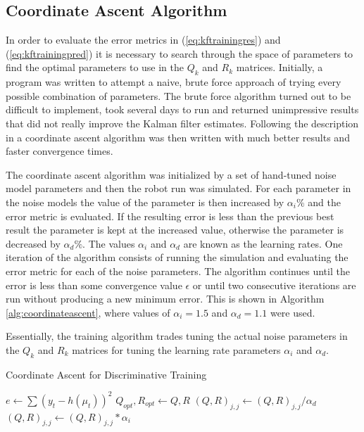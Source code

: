\subsection{Coordinate Ascent Algorithm}
\label{sec:coordinateAscent}
In order to evaluate the error metrics in (\ref{eq:kftrainingres}) and (\ref{eq:kftrainingpred}) it is necessary to search through the space of parameters to find the optimal parameters to use in the $Q_k$ and $R_k$ matrices. Initially, a program was written to attempt a naive, brute force approach of trying every possible combination of parameters. The brute force algorithm turned out to be difficult to implement, took several days to run and returned unimpressive results that did not really improve the Kalman filter estimates. Following the description in \cite{Abbeel-RSS-05} a coordinate ascent algorithm was then written with much better results and faster convergence times.

The coordinate ascent algorithm was initialized by a set of hand-tuned noise model parameters and then the robot run was simulated. For each parameter in the noise models the value of the parameter is then increased by $\alpha_i \%$ and the error metric is evaluated. If the resulting error is less than the previous best result the parameter is kept at the increased value, otherwise the parameter is decreased by $\alpha_d \%$. The values $\alpha_i$ and $\alpha_d$ are known as the learning rates. One iteration of the algorithm consists of running the simulation and evaluating the error metric for each of the noise parameters. The algorithm continues until the error is less than some convergence value $\epsilon$ or until two consecutive iterations are run without producing a new minimum error. This is shown in Algorithm \ref{alg:coordinateascent}, where values of $\alpha_i=1.5$ and $\alpha_d=1.1$ were used.

Essentially, the training algorithm trades tuning the actual noise parameters in the $Q_k$ and $R_k$ matrices for tuning the learning rate parameters $\alpha_i$ and $\alpha_d$.

\begin{algorithm}
\caption{Coordinate Ascent for Discriminative Training}
\label{alg:coordinateascent}
\begin{algorithmic}
        \STATE $e \gets \sum(y_t-h(\mu_t))^2$
            \STATE $Q_{opt}, R_{opt} \gets Q, R$
            \STATE $(Q,R)_{j,j} \gets (Q,R)_{j,j} / \alpha_d$
        \ELSE
            \STATE $(Q,R)_{j,j} \gets (Q,R)_{j,j} * \alpha_i$
        \ENDIF
    \ENDFOR
\ENDWHILE
\end{algorithmic}
\end{algorithm}
